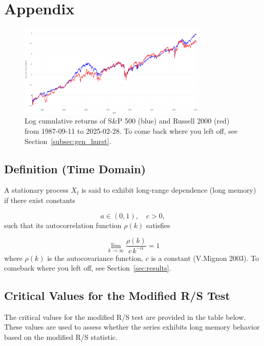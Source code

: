 \documentclass[11pt]{extarticle}
\begin{document}
\section{Appendix}

\begin{figure}[ht]
    \centering
    \includegraphics[width=0.8\textwidth]{img/log_cumulative_returns.png}
    \caption{Log cumulative returns of S\&P 500 (blue) and Russell 2000 (red) from 1987-09-11 to 2025-02-28.
    To come back where you left off, see Section~\ref{subsec:gen_hurst}.}
    \label{fig:cumulative_returns}
\end{figure}

\FloatBarrier

\subsection{Definition (Time Domain)}
\label{sec:long_range_dependence}
A stationary process \(X_t\) is said to exhibit long‐range dependence (long memory) if there exist constants

\[
a\in(0,1),\quad c>0,
\]
such that its autocorrelation function \(\rho(k)\) satisfies

\begin{equation}
\lim_{k \to \infty}
\frac{\rho(k)}{c\,k^{-\alpha}}
=1
\end{equation}
where \(\rho(k)\) is the autocovariance function, \(c\) is a constant (V.Mignon 2003). To comeback where you left off,
see Section~\ref{sec:results}.

\subsection{Critical Values for the Modified R/S Test}

The critical values for the modified R/S test are provided in the table below. These values are used to assess whether the series exhibits long memory behavior based on the modified R/S statistic.
\end{document}
